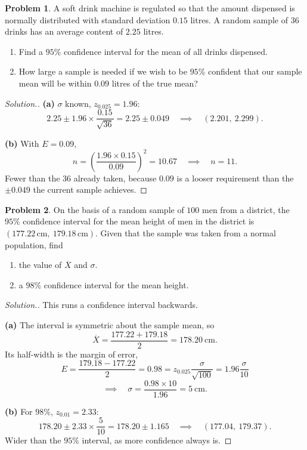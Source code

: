 \documentclass[11pt,a4paper]{article}
\theoremstyle{definition}
\newtheorem{problemx}{Problem}[section]
\newenvironment{problem}{\begin{problemx}}{\end{problemx}}
\newenvironment{solution}
  {\renewcommand{\qedsymbol}{}\begin{proof}[\textit{Solution}.]}
  {\end{proof}}
\begin{document}
\begin{problem}
A soft drink machine is regulated so that the amount dispensed is normally distributed with
standard deviation $0.15$ litres. A random sample of $36$ drinks has an average content of
$2.25$ litres.
\begin{enumerate}
\item[(a).] Find a $95\%$ confidence interval for the mean of all drinks dispensed.
\item[(b).] How large a sample is needed if we wish to be $95\%$ confident that our sample
mean will be within $0.09$ litres of the true mean?
\end{enumerate}
\end{problem}

\begin{solution}
\textbf{(a)} $\sigma$ known, $z_{0.025}=1.96$:
\[2.25\pm 1.96\times\frac{0.15}{\sqrt{36}}=2.25\pm 0.049
\quad\implies\quad (2.201,\ 2.299).\]

\textbf{(b)} With $E=0.09$,
\[n=\left(\frac{1.96\times 0.15}{0.09}\right)^2=10.67\quad\implies\quad n=11.\]
Fewer than the $36$ already taken, because $0.09$ is a looser requirement than the
$\pm 0.049$ the current sample achieves.
\end{solution}

\begin{problem}
On the basis of a random sample of $100$ men from a district, the $95\%$ confidence interval
for the mean height of men in the district is $(177.22\,\text{cm},\ 179.18\,\text{cm})$.
Given that the sample was taken from a normal population, find
\begin{enumerate}
\item[(a).] the value of $\overline{X}$ and $\sigma$.
\item[(b).] a $98\%$ confidence interval for the mean height.
\end{enumerate}
\end{problem}

\begin{solution}
This runs a confidence interval backwards.

\textbf{(a)} The interval is symmetric about the sample mean, so
\[\overline{X}=\frac{177.22+179.18}{2}=178.20\ \text{cm}.\]
Its half-width is the margin of error,
\[E=\frac{179.18-177.22}{2}=0.98=z_{0.025}\frac{\sigma}{\sqrt{100}}=1.96\frac{\sigma}{10}\]
\[\implies\quad \sigma=\frac{0.98\times 10}{1.96}=5\ \text{cm}.\]

\textbf{(b)} For $98\%$, $z_{0.01}=2.33$:
\[178.20\pm 2.33\times\frac{5}{10}=178.20\pm 1.165
\quad\implies\quad (177.04,\ 179.37).\]
Wider than the $95\%$ interval, as more confidence always is.
\end{solution}
\end{document}
